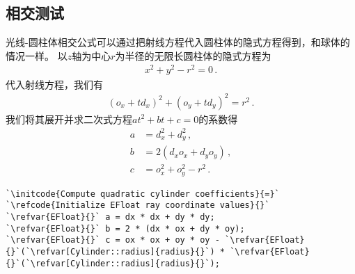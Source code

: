 \subsection{相交测试}\label{sub:相交测试3}
光线-圆柱体相交公式可以通过把射线方程代入圆柱体的隐式方程得到，和球体的情况一样。
以$z$轴为中心$r$为半径的无限长圆柱体的隐式方程为
\begin{align*}
    x^2+y^2-r^2=0\, .
\end{align*}
代入射线方程，我们有
\begin{align*}
    (o_x+td_x)^2+(o_y+td_y)^2=r^2\, .
\end{align*}
我们将其展开并求二次式方程$at^2+bt+c=0$的系数得
\begin{align*}
    a & =d_x^2+d_y^2\, ,      \\
    b & =2(d_xo_x+d_yo_y)\, , \\
    c & =o_x^2+o_y^2-r^2\, .
\end{align*}
\begin{lstlisting}
`\initcode{Compute quadratic cylinder coefficients}{=}`
`\refcode{Initialize EFloat ray coordinate values}{}`
`\refvar{EFloat}{}` a = dx * dx + dy * dy;
`\refvar{EFloat}{}` b = 2 * (dx * ox + dy * oy);
`\refvar{EFloat}{}` c = ox * ox + oy * oy - `\refvar{EFloat}{}`(`\refvar[Cylinder::radius]{radius}{}`) * `\refvar{EFloat}{}`(`\refvar[Cylinder::radius]{radius}{}`);
\end{lstlisting}